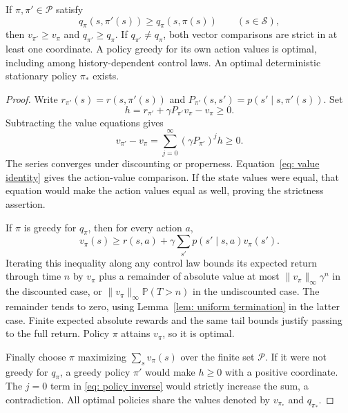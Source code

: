 \begin{lemma}\label{thm: strict PIT}
If $\pi,\pi'\in\mathcal P$ satisfy
\begin{equation}\label{eq: PIT condition}
q_\pi(s,\pi'(s))\ge q_\pi(s,\pi(s))\qquad(s\in\mathcal S),
\end{equation}
then $v_{\pi'}\ge v_\pi$ and $q_{\pi'}\ge q_\pi$. If $q_{\pi'}\ne q_\pi$, both vector comparisons are strict in at least one coordinate. A policy greedy for its own action values is optimal, including among history-dependent control laws. An optimal deterministic stationary policy $\pi_*$ exists.
\end{lemma}
\begin{proof}
Write $r_{\pi'}(s)=r(s,\pi'(s))$ and $P_{\pi'}(s,s')=p(s'\mid s,\pi'(s))$. Set
\[
h=r_{\pi'}+\gamma P_{\pi'}v_\pi-v_\pi\ge0.
\]
Subtracting the value equations gives
\begin{equation}\label{eq: policy inverse}
v_{\pi'}-v_\pi=\sum_{j=0}^\infty(\gamma P_{\pi'})^j h\ge0.
\end{equation}
The series converges under discounting or properness. Equation~\eqref{eq: value identity} gives the action-value comparison. If the state values were equal, that equation would make the action values equal as well, proving the strictness assertion.

If $\pi$ is greedy for $q_\pi$, then for every action $a$,
\[
v_\pi(s)\ge r(s,a)+\gamma\sum_{s'}p(s'\mid s,a)v_\pi(s').
\]
Iterating this inequality along any control law bounds its expected return through time $n$ by $v_\pi$ plus a remainder of absolute value at most $\|v_\pi\|_\infty\gamma^n$ in the discounted case, or $\|v_\pi\|_\infty\mathbb P(T>n)$ in the undiscounted case. The remainder tends to zero, using Lemma~\ref{lem: uniform termination} in the latter case. Finite expected absolute rewards and the same tail bounds justify passing to the full return. Policy $\pi$ attains $v_\pi$, so it is optimal.

Finally choose $\pi$ maximizing $\sum_s v_\pi(s)$ over the finite set $\mathcal P$. If it were not greedy for $q_\pi$, a greedy policy $\pi'$ would make $h\ge0$ with a positive coordinate. The $j=0$ term in \eqref{eq: policy inverse} would strictly increase the sum, a contradiction. All optimal policies share the values denoted by $v_{\pi_*}$ and $q_{\pi_*}$.
\end{proof}


